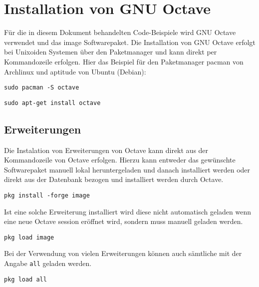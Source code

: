 \section{Installation von GNU Octave}
Für die in diesem Dokument behandelten Code-Beispiele wird GNU Octave
verwendet und das image Softwarepaket. Die Installation von GNU Octave
erfolgt bei Unixoiden Systemen über den Paketmanager und kann direkt
per Kommandozeile erfolgen. Hier das Beispiel für den Paketmanager
pacman von Archlinux und aptitude von Ubuntu (Debian):

\begin{lstlisting}
sudo pacman -S octave
\end{lstlisting}

\begin{lstlisting}
sudo apt-get install octave
\end{lstlisting}

\subsection{Erweiterungen}
Die Instalation von Erweiterungen von Octave kann direkt aus der
Kommandozeile von Octave erfolgen. Hierzu kann entweder das gewünschte
Softwarepaket manuell lokal heruntergeladen und danach installiert werden
oder direkt aus der Datenbank bezogen und installiert werden durch
Octave.

\begin{lstlisting}
pkg install -forge image
\end{lstlisting}

Ist eine solche Erweiterung installiert wird diese nicht automatisch geladen
wenn eine neue Octave session eröffnet wird, sondern muss manuell geladen
werden.

\begin{lstlisting}
pkg load image
\end{lstlisting}

Bei der Verwendung von vielen Erweiterungen können auch sämtliche mit der
Angabe \lstinline{all} geladen werden.

\begin{lstlisting}
pkg load all
\end{lstlisting}
